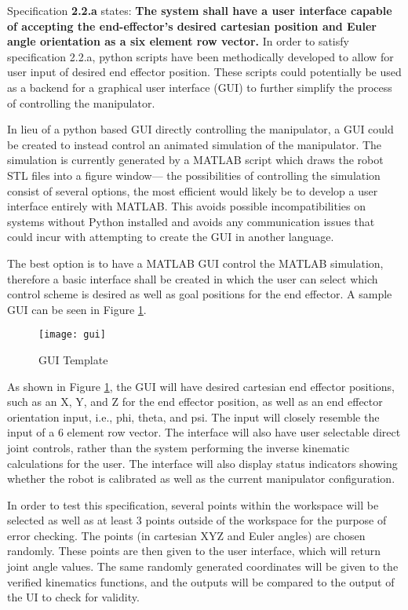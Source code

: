 Specification \textbf{2.2.a} states: \textbf{The system shall have a user interface capable of accepting the end-effector’s desired cartesian position and Euler angle orientation as a six element row vector.} In order to satisfy specification 2.2.a, python scripts have been methodically developed to allow for user input of desired end effector position. These scripts could potentially be used as a backend for a graphical user interface (GUI) to further simplify the process of controlling the manipulator.

In lieu of a python based GUI directly controlling the manipulator, a GUI could be created to instead control an animated simulation of the manipulator. The simulation is currently generated by a MATLAB script which draws the robot STL files into a figure window— the possibilities of controlling the simulation consist of several options, the most efficient would likely be to develop a user interface entirely with MATLAB. This avoids possible incompatibilities on systems without Python installed and avoids any communication issues that could incur with attempting to create the GUI in another language.

The best option is to have a MATLAB GUI control the MATLAB simulation, therefore a basic interface shall be created in which the user can select which control scheme is desired as well as goal positions for the end effector. A sample GUI can be seen in Figure \ref{fig:gui}.
\let\clearpage\relax
\begin{figure}[htp]
  \centering
  \texttt{[image: gui]}
  \caption{GUI Template}
  \label{fig:gui}
\end{figure}

As shown in Figure \ref{fig:gui}, the GUI will have desired cartesian end effector positions, such as an X, Y, and Z for the end effector position, as well as an end effector orientation input, i.e., phi, theta, and psi. The input will closely resemble the input of a 6 element row vector. The interface will also have user selectable direct joint controls, rather than the system performing the inverse kinematic calculations for the user. The interface will also display status indicators showing whether the robot is calibrated as well as the current manipulator configuration.

In order to test this specification, several points within the workspace will be selected as well as at least 3 points outside of the workspace for the purpose of error checking. The points (in cartesian XYZ and Euler angles) are chosen randomly. These points are then given to the user interface, which will return joint angle values. The same randomly generated coordinates will be given to the verified kinematics functions, and the outputs will be compared to the output of the UI to check for validity.

